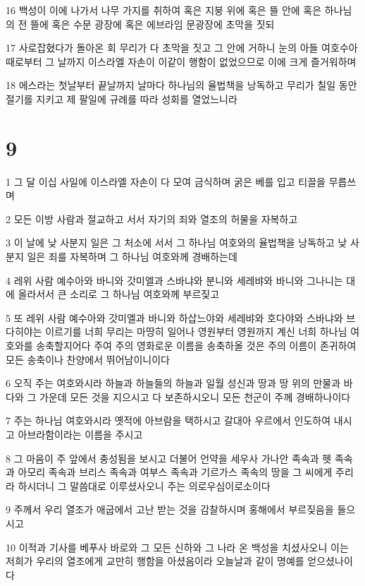 \par 16 백성이 이에 나가서 나무 가지를 취하여 혹은 지붕 위에 혹은 뜰 안에 혹은 하나님의 전 뜰에 혹은 수문 광장에 혹은 에브라임 문광장에 초막을 짓되
\par 17 사로잡혔다가 돌아온 회 무리가 다 초막을 짓고 그 안에 거하니 눈의 아들 여호수아 때로부터 그 날까지 이스라엘 자손이 이같이 행함이 없었으므로 이에 크게 즐거워하며
\par 18 에스라는 첫날부터 끝날까지 날마다 하나님의 율법책을 낭독하고 무리가 칠일 동안 절기를 지키고 제 팔일에 규례를 따라 성회를 열었느니라

\chapter{9}

\par 1 그 달 이십 사일에 이스라엘 자손이 다 모여 금식하며 굵은 베를 입고 티끌을 무릅쓰며
\par 2 모든 이방 사람과 절교하고 서서 자기의 죄와 열조의 허물을 자복하고
\par 3 이 날에 낮 사분지 일은 그 처소에 서서 그 하나님 여호와의 율법책을 낭독하고 낮 사분지 일은 죄를 자복하며 그 하나님 여호와께 경배하는데
\par 4 레위 사람 예수아와 바니와 갓미엘과 스바냐와 분니와 세레뱌와 바니와 그나니는 대에 올라서서 큰 소리로 그 하나님 여호와께 부르짖고
\par 5 또 레위 사람 예수아와 갓미엘과 바니와 하삽느야와 세레뱌와 호다야와 스바냐와 브다히야는 이르기를 너희 무리는 마땅히 일어나 영원부터 영원까지 계신 너희 하나님 여호와를 송축할지어다 주여 주의 영화로운 이름을 송축하올 것은 주의 이름이 존귀하여 모든 송축이나 찬양에서 뛰어남이니이다
\par 6 오직 주는 여호와시라 하늘과 하늘들의 하늘과 일월 성신과 땅과 땅 위의 만물과 바다와 그 가운데 모든 것을 지으시고 다 보존하시오니 모든 천군이 주께 경배하나이다
\par 7 주는 하나님 여호와시라 옛적에 아브람을 택하시고 갈대아 우르에서 인도하여 내시고 아브라함이라는 이름을 주시고
\par 8 그 마음이 주 앞에서 충성됨을 보시고 더불어 언약을 세우사 가나안 족속과 헷 족속과 아모리 족속과 브리스 족속과 여부스 족속과 기르가스 족속의 땅을 그 씨에게 주리라 하시더니 그 말씀대로 이루셨사오니 주는 의로우심이로소이다
\par 9 주께서 우리 열조가 애굽에서 고난 받는 것을 감찰하시며 홍해에서 부르짖음을 들으시고
\par 10 이적과 기사를 베푸사 바로와 그 모든 신하와 그 나라 온 백성을 치셨사오니 이는 저희가 우리의 열조에게 교만히 행함을 아셨음이라 오늘날과 같이 명예를 얻으셨나이다
